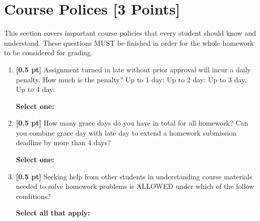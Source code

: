 \documentclass[12pt]{article}
\renewcommand{\circle}{\tikz\draw[black] (0,0) circle (1ex);}
\begin{document}
\section{Course Polices [3 Points]}
This section covers important course policies that every student should know and understand. These questions MUST be finished in order for the whole homework to be considered for grading.
\begin{enumerate}
    \item \textbf{[0.5 pt]} Assignment turned in late without prior approval will incur a daily penalty. How much is the penalty? Up to 1 day: \underline{\hspace{0.5cm}} Up to 2 day: \underline{\hspace{0.5cm}} Up to 3 day:
    \underline{\hspace{0.5cm}} Up to 4 day:
    \underline{\hspace{0.5cm}} 
    
    \textbf{Select one:}

    
    \item \textbf{[0.5 pt]} How many grace days do you have in total for all homework? Can you combine grace day with late day to extend a homework submission deadline by more than 4 days?
    
    \textbf{Select one:}

    
    \item \textbf{[0.5 pt]} Seeking help from other students in understanding course materials needed to solve homework problems is ALLOWED under which of the follow conditions?
    
    \textbf{Select all that apply:}


\end{enumerate}
\end{document}
